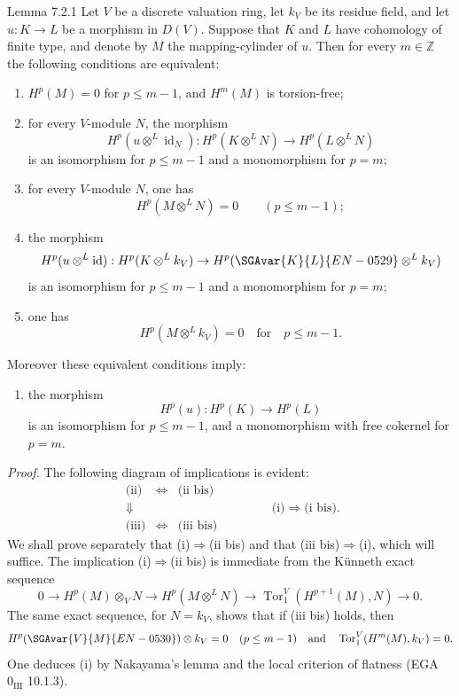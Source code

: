 \begin{statement}{Lemma 7.2.1}
Let $V$ be a discrete valuation ring, let $k_V$ be its residue field, and let $u:K\to L$ be a morphism in $D(V)$. Suppose that $K$ and $L$ have cohomology of finite type, and denote by $M$ the mapping-cylinder of $u$. Then for every $m\in\mathbb Z$ the following conditions are equivalent:
\begin{enumerate}[label=(\roman*)]
\item $H^p(M)=0$ for $p\le m-1$, and $H^m(M)$ is torsion-free;
\item for every $V$-module $N$, the morphism
\[
H^p(u\otimes^L\operatorname{id}_N):H^p(K\otimes^L N)\to H^p(L\otimes^L N)
\]
is an isomorphism for $p\le m-1$ and a monomorphism for $p=m$;
\item[(ii bis)] for every $V$-module $N$, one has
\[
H^p(M\otimes^L N)=0\qquad(p\le m-1);
\]
\item the morphism
\[
H^p(u\otimes^L\operatorname{id}):H^p(K\otimes^L k_V)\to H^p(\SGAvar{K}{L}{EN-0529}\otimes^L k_V)
\]
is an isomorphism for $p\le m-1$ and a monomorphism for $p=m$;
\item[(iii bis)] one has
\[
H^p(M\otimes^L k_V)=0\quad\text{for}\quad p\le m-1.
\]
\end{enumerate}
Moreover these equivalent conditions imply:
\begin{enumerate}[label=(\roman* bis)]
\item the morphism
\[
H^p(u):H^p(K)\to H^p(L)
\]
is an isomorphism for $p\le m-1$, and a monomorphism with free cokernel for $p=m$.
\end{enumerate}
\end{statement}

\emph{Proof.} The following diagram of implications is evident:
\[
\begin{array}{ccc}
\text{(ii)}&\Leftrightarrow&\text{(ii bis)}\\
\Downarrow&&\\
\text{(iii)}&\Leftrightarrow&\text{(iii bis)}
\end{array}
\qquad\qquad
\text{(i)}\Rightarrow\text{(i bis).}
\]
We shall prove separately that (i)$\Rightarrow$(ii bis) and that (iii bis)$\Rightarrow$(i), which will suffice. The implication (i)$\Rightarrow$(ii bis) is immediate from the Künneth exact sequence
\[
0\to H^p(M)\otimes_V N\to H^p(M\otimes^L N)\to \operatorname{Tor}_1^V(H^{p+1}(M),N)\to0.
\]
The same exact sequence, for $N=k_V$, shows that if (iii bis) holds, then
\[
H^p(\SGAvar{V}{M}{EN-0530})\otimes k_V=0\quad(p\le m-1)\quad\text{and}\quad
\operatorname{Tor}_1^V(H^m(M),k_V)=0.
\]
One deduces (i) by Nakayama's lemma and the local criterion of flatness (EGA $0_{\mathrm{III}}$ 10.1.3).

